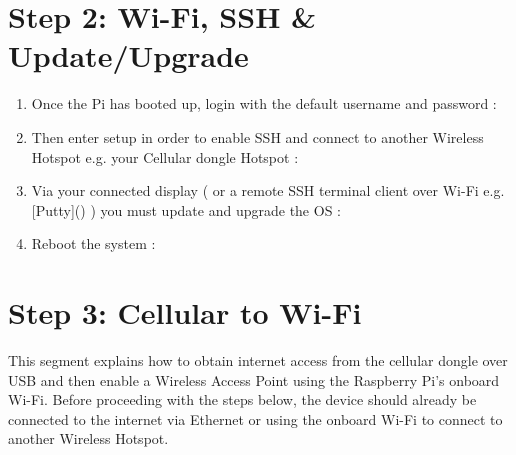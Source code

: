 \documentclass[letterpaper,10pt,openany,oneside,english]{sphinxmanual}
\begin{document}
\section{Step 2: Wi-Fi, SSH \& Update/Upgrade}
\label{\detokenize{manual_build:step-2-wi-fi-ssh-update-upgrade}}\begin{enumerate}
\item {} 
Once the Pi has booted up, login with the default username and password :
\begin{quote}


\end{quote}

\item {} 
Then enter setup in order to enable SSH and connect to another Wireless Hotspot e.g. your Cellular dongle Hotspot :
\begin{quote}

\end{quote}

\item {} 
Via your connected display ( or a remote SSH terminal client over Wi-Fi e.g. {[}Putty{]}() ) you must update and upgrade the OS :
\begin{quote}


\end{quote}

\item {} 
Reboot the system :
\begin{quote}

\end{quote}

\end{enumerate}


\section{Step 3: Cellular to Wi-Fi}
\label{\detokenize{manual_build:step-3-cellular-to-wi-fi}}
This segment explains how to obtain internet access from the cellular dongle over USB and then enable a Wireless Access Point using the Raspberry Pi’s onboard Wi-Fi.
Before proceeding with the steps below, the device should already be connected to the internet via Ethernet or using the onboard Wi-Fi to connect to another Wireless Hotspot.
\end{document}
